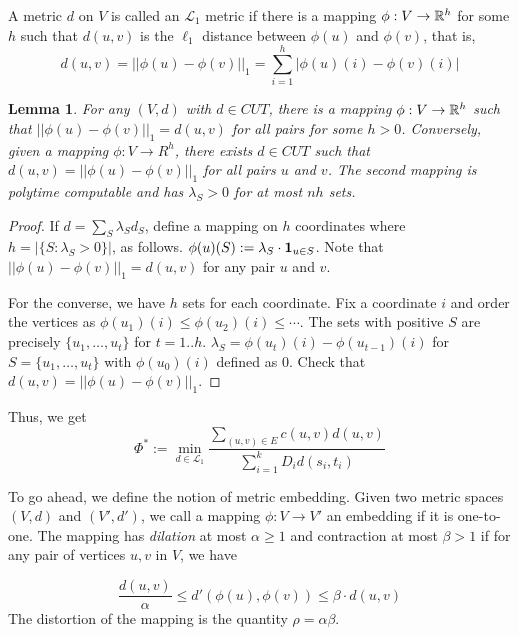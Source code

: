 \documentclass[11pt]{article}
\newtheorem{lemma}{Lemma}
\begin{document}
\noindent
\def\L{{\mathcal L}}
A metric $d$ on $V$ is called an $\L_1$ metric if there is a mapping $\phi:V\to {\mathbb R}^h$ for some $h$ such that 
$d(u,v)$ is the $\ell_1$ distance between $\phi(u)$ and $\phi(v)$, that is, 
$$d(u,v) = ||\phi(u) - \phi(v)||_1 = \sum_{i=1}^h |\phi(u)(i) - \phi(v)(i)|$$

\begin{lemma}\label{lem:cutl1}
For any $(V,d)$ with $d\in CUT$, there is a mapping $\phi:V\to {\mathbb R}^h$ such that $||\phi(u) - \phi(v)||_1 = d(u,v)$ for all pairs
for some $h > 0$.
Conversely, given a mapping $\phi:V\to R^h$, there exists $d\in CUT$ such that 
$d(u,v) = ||\phi(u) - \phi(v)||_1$ for all pairs $u$ and $v$. The second mapping is polytime computable and has $\lambda_S>0$
for at most $nh$ sets.
\end{lemma}
\begin{proof}
If $d = \sum_S\lambda_Sd_S$, define a mapping on $h$ coordinates where $h = |\{S:\lambda_S > 0\}|$, as follows.
$\phi(u)(S) := \lambda_S\cdot{\bf 1}_{u\in S}$. Note that $||\phi(u) - \phi(v)||_1 = d(u,v)$ for any pair $u$ and $v$.

For the converse, we have $h$ sets for each coordinate. Fix a coordinate $i$ and order the vertices as 
$\phi(u_1)(i) \le \phi(u_2)(i) \le \cdots $. The sets with positive $S$ are precisely $\{u_1,\ldots,u_t\}$ for $t=1..h$.
$\lambda_S = \phi(u_t)(i) - \phi(u_{t-1})(i)$ for $S= \{u_1,\ldots,u_t\}$ with $\phi(u_0)(i)$ defined as $0$.
Check that $d(u,v) = ||\phi(u) - \phi(v)||_1$.
\end{proof}

Thus, we get 
$$\Phi^* := \min_{d\in \L_1} \frac{\sum_{(u,v)\in E} c(u,v)d(u,v)}{\sum_{i=1}^k D_id(s_i,t_i)}$$

\noindent
To go ahead, we define the notion of metric embedding. Given two metric spaces $(V,d)$ and $(V',d')$, we call a mapping
$\phi:V\to V'$ an embedding if it is one-to-one. The mapping has {\em dilation} at most $\alpha \ge 1$ and contraction at most $\beta > 1$ if for any pair of vertices $u,v$ in $V$, we have 

$$\frac{d(u,v)}{\alpha} \le d'(\phi(u),\phi(v)) \le \beta\cdot d(u,v)$$
The distortion of the mapping is the quantity $\rho = \alpha\beta$.%
\medskip
%
%
\end{document}
